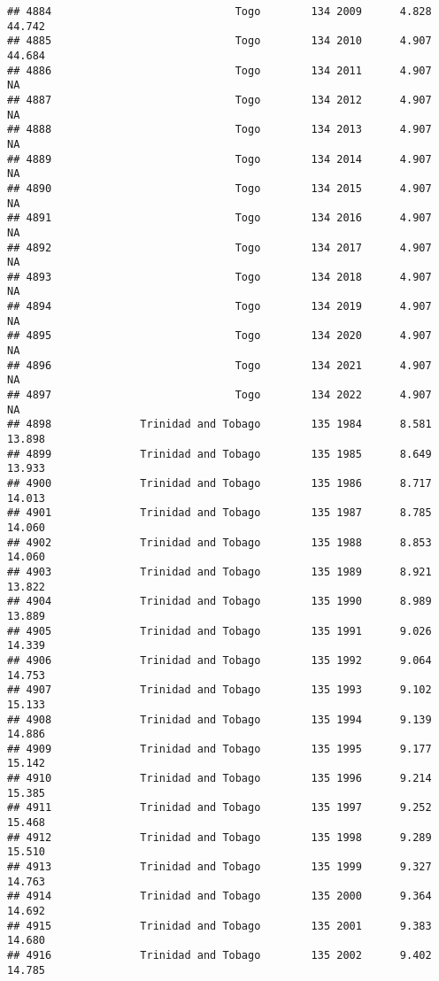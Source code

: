 \documentclass[
]{article}
\begin{document}
\begin{verbatim}
## 4884                             Togo        134 2009      4.828     44.742
## 4885                             Togo        134 2010      4.907     44.684
## 4886                             Togo        134 2011      4.907         NA
## 4887                             Togo        134 2012      4.907         NA
## 4888                             Togo        134 2013      4.907         NA
## 4889                             Togo        134 2014      4.907         NA
## 4890                             Togo        134 2015      4.907         NA
## 4891                             Togo        134 2016      4.907         NA
## 4892                             Togo        134 2017      4.907         NA
## 4893                             Togo        134 2018      4.907         NA
## 4894                             Togo        134 2019      4.907         NA
## 4895                             Togo        134 2020      4.907         NA
## 4896                             Togo        134 2021      4.907         NA
## 4897                             Togo        134 2022      4.907         NA
## 4898              Trinidad and Tobago        135 1984      8.581     13.898
## 4899              Trinidad and Tobago        135 1985      8.649     13.933
## 4900              Trinidad and Tobago        135 1986      8.717     14.013
## 4901              Trinidad and Tobago        135 1987      8.785     14.060
## 4902              Trinidad and Tobago        135 1988      8.853     14.060
## 4903              Trinidad and Tobago        135 1989      8.921     13.822
## 4904              Trinidad and Tobago        135 1990      8.989     13.889
## 4905              Trinidad and Tobago        135 1991      9.026     14.339
## 4906              Trinidad and Tobago        135 1992      9.064     14.753
## 4907              Trinidad and Tobago        135 1993      9.102     15.133
## 4908              Trinidad and Tobago        135 1994      9.139     14.886
## 4909              Trinidad and Tobago        135 1995      9.177     15.142
## 4910              Trinidad and Tobago        135 1996      9.214     15.385
## 4911              Trinidad and Tobago        135 1997      9.252     15.468
## 4912              Trinidad and Tobago        135 1998      9.289     15.510
## 4913              Trinidad and Tobago        135 1999      9.327     14.763
## 4914              Trinidad and Tobago        135 2000      9.364     14.692
## 4915              Trinidad and Tobago        135 2001      9.383     14.680
## 4916              Trinidad and Tobago        135 2002      9.402     14.785

\end{verbatim}
\end{document}
